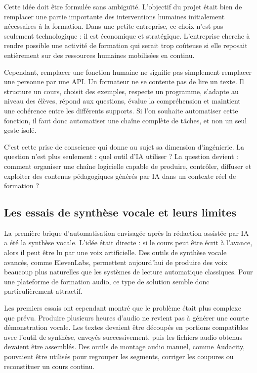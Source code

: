 Cette idée doit être formulée sans ambiguïté. L'objectif du projet était bien de remplacer
une partie importante des interventions humaines initialement nécessaires à la formation.
Dans une petite entreprise, ce choix n'est pas seulement technologique : il est économique
et stratégique. L'entreprise cherche à rendre possible une activité de formation qui serait
trop coûteuse si elle reposait entièrement sur des ressources humaines mobilisées en
continu.

Cependant, remplacer une fonction humaine ne signifie pas simplement remplacer une
personne par une API. Un formateur ne se contente pas de lire un texte. Il structure un
cours, choisit des exemples, respecte un programme, s'adapte au niveau des élèves,
répond aux questions, évalue la compréhension et maintient une cohérence entre les
différents supports. Si l'on souhaite automatiser cette fonction, il faut donc automatiser
une chaîne complète de tâches, et non un seul geste isolé.

C'est cette prise de conscience qui donne au sujet sa dimension d'ingénierie. La question
n'est plus seulement : quel outil d'IA utiliser ? La question devient : comment organiser
une chaîne logicielle capable de produire, contrôler, diffuser et exploiter des contenus
pédagogiques générés par IA dans un contexte réel de formation ?

\subsection{Les essais de synthèse vocale et leurs limites}

La première brique d'automatisation envisagée après la rédaction assistée par IA a été la
synthèse vocale. L'idée était directe : si le cours peut être écrit à l'avance, alors il peut
être lu par une voix artificielle. Des outils de synthèse vocale avancés, comme
ElevenLabs, permettent aujourd'hui de produire des voix beaucoup plus naturelles que les
systèmes de lecture automatique classiques. Pour une plateforme de formation audio, ce
type de solution semble donc particulièrement attractif.

Les premiers essais ont cependant montré que le problème était plus complexe que prévu.
Produire plusieurs heures d'audio ne revient pas à générer une courte démonstration
vocale. Les textes devaient être découpés en portions compatibles avec l'outil de synthèse,
envoyés successivement, puis les fichiers audio obtenus devaient être assemblés. Des
outils de montage audio manuel, comme Audacity, pouvaient être utilisés pour regrouper
les segments, corriger les coupures ou reconstituer un cours continu.


